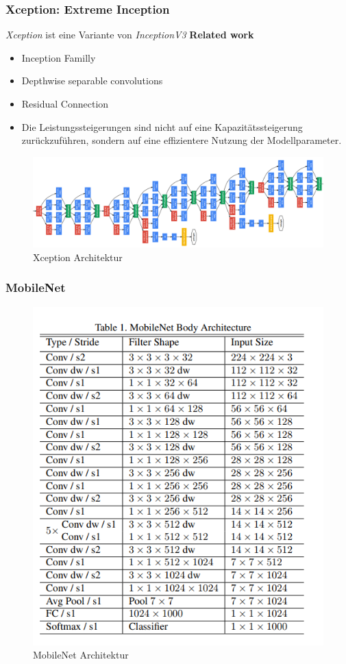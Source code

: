 \documentclass[12pt,a4paper]{scrartcl}
\numberwithin{equation}{section}
\begin{document}
\subsubsection{Xception: Extreme Inception}
\textit{Xception} ist eine Variante von \textit{InceptionV3}
\textbf{Related work}
\begin{itemize}
	\item Inception Familly
	\item Depthwise separable convolutions
	\item Residual Connection
	\item Die Leistungssteigerungen sind nicht auf eine Kapazitätssteigerung zurückzuführen, sondern auf eine effizientere Nutzung der Modellparameter.
	
\end{itemize}
\begin{figure}[h]
	\centering
	\includegraphics[width=\textwidth ]{Xception}
	\caption{ Xception Architektur}
	\label{fig:Xception}
\end{figure}
\subsubsection{MobileNet}
\begin{figure}[h]
	\centering
	\includegraphics[width=\textwidth,height=0.8\linewidth]{MobileNet}
	\caption{ MobileNet Architektur }
	\label{fig:MobileNet}
\end{figure}
\end{document}
